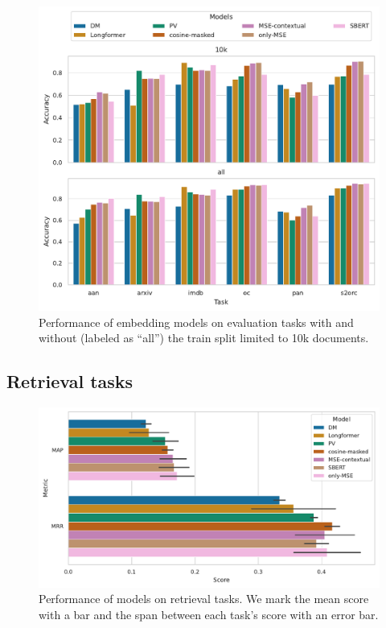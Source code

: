 \begin{figure}

  \centering
  \includegraphics[width=\textwidth]{img/final_cls_evals.pdf}

  \caption{Performance of embedding models on evaluation tasks with and without
  (labeled as ``all'') the train split limited to 10k documents.}

  \label{fig:final_cls_evals}

\end{figure}

\subsection{Retrieval tasks}

\begin{figure}[p]

  \includegraphics[width=\textwidth]{img/final_sims_evals.pdf}

  \caption{Performance of models on retrieval tasks. We mark the mean score
  with a bar and the span between each task's score with an error bar.}

  \label{fig:final_eval_sims}

\end{figure}

